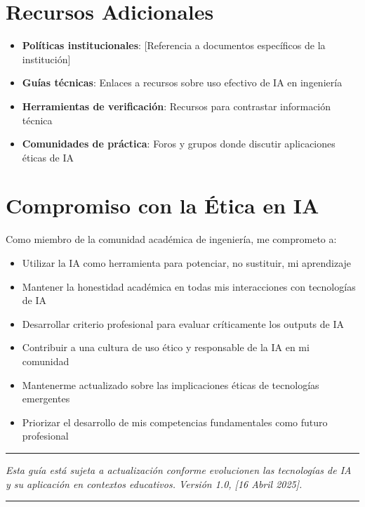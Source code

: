 \documentclass[11pt, letterpaper]{article}
\begin{document}
	\section{Recursos Adicionales}
	
	\begin{itemize}
		\item \textbf{Políticas institucionales}: [Referencia a documentos específicos de la institución]
		\item \textbf{Guías técnicas}: Enlaces a recursos sobre uso efectivo de IA en ingeniería
		\item \textbf{Herramientas de verificación}: Recursos para contrastar información técnica
		\item \textbf{Comunidades de práctica}: Foros y grupos donde discutir aplicaciones éticas de IA
	\end{itemize}
	
	\section{Compromiso con la Ética en IA}
	
	Como miembro de la comunidad académica de ingeniería, me comprometo a:
	
	\begin{itemize}
		\item Utilizar la IA como herramienta para potenciar, no sustituir, mi aprendizaje
		\item Mantener la honestidad académica en todas mis interacciones con tecnologías de IA
		\item Desarrollar criterio profesional para evaluar críticamente los outputs de IA
		\item Contribuir a una cultura de uso ético y responsable de la IA en mi comunidad
		\item Mantenerme actualizado sobre las implicaciones éticas de tecnologías emergentes
		\item Priorizar el desarrollo de mis competencias fundamentales como futuro profesional
	\end{itemize}
	
	\vspace{1cm}
	
	\rule{\textwidth}{1pt}
	\begin{center}
		\textit{Esta guía está sujeta a actualización conforme evolucionen las tecnologías de IA y su aplicación en contextos educativos. Versión 1.0, [16 Abril 2025].}
	\end{center}
	\rule{\textwidth}{1pt}
	
\end{document}
